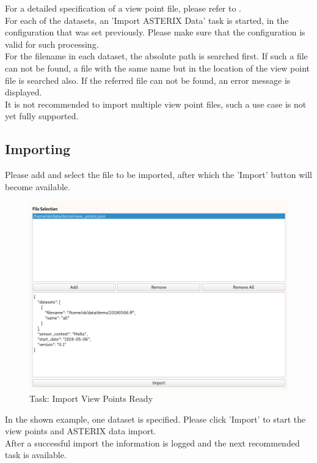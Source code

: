 For a detailed specification of a view point file, please refer to . \\

For each of the datasets, an 'Import ASTERIX Data' task is started, in the configuration that was set previously. Please make sure that the configuration is valid for such processing. \\

For the filename in each dataset, the absolute path is searched first. If such a file can not be found, a file with the same name but in the location of the view point file is searched also. If the referred file can not be found, an error message is displayed. \\

It is not recommended to import multiple view point files, such a use case is not yet fully supported.

\subsection{Importing}

Please add and select the file to be imported, after which the 'Import' button will become available. \\

\begin{figure}[H]
    \includegraphics[width=16cm,frame]{figures/view_point_import_ready.png}
  \caption{Task: Import View Points Ready}
\end{figure}

In the shown example, one dataset is specified. Please click 'Import' to start the view points and ASTERIX data import. \\

After a successful import the information is logged and the next recommended task is available.
